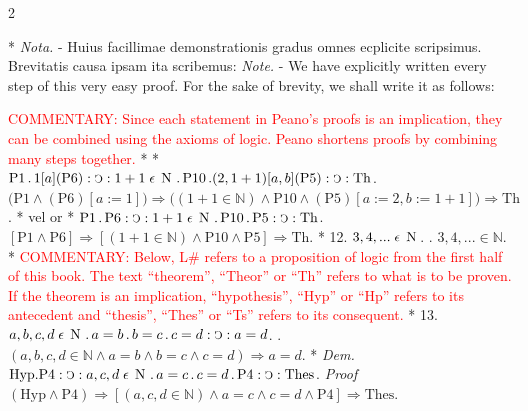 \documentclass{book}
\newcommand{\C}{\mathop{\sbox0{$\displaystyle$$\reflectbox{C}$} %
\raisebox{-\height+\ht0-0.05cm}[\ht0][\dp0]{\scalebox{0.8}[0.8]{\copy0}}}\displaylimits} %
\newcommand{\p}{\mathop{\sbox0{$\displaystyle$$.$}
\raisebox{-\height+\ht0}[\ht0][\dp0]{\scalebox{1}[1]{\copy0}}}\displaylimits} %
\newcommand{\smallIn}{\ensuremath{\mathrel{\epsilon}}}
\newcommand{\N}{\mathop{\thinspace \text{N} \thinspace}}
\renewcommand{\rightarrow}{\Rightarrow}
\newcommand\commentary[1]{\textcolor{red}{COMMENTARY: #1}}
\newenvironment{translateTwoCol}
               { %
                 \columnratio{0.5, 0.5}
                 \begin{paracol}{2}
                 \newcommand{\LAT}{\switchcolumn[0]*}
                 \newcommand{\ENG}{\switchcolumn[1]}
               }
               { %
                 \let\ENG\undefined
                 \let\LAT\undefined
                 \end{paracol}
               }
\begin{document}
\begin{translateTwoCol}
\vspace{1em}
\ENG
\vspace{1em}
\LAT
\emph{Nota.} - Huius facillimae demonstrationis gradus omnes ecplicite scripsimus. Brevitatis causa ipsam ita scribemus:
\ENG
\emph{Note.} - We have explicitly written every step of this very easy proof. For the sake of brevity, we shall write it as follows:

\commentary{Since each statement in Peano's proofs is an implication, they can be combined using the axioms of logic.  Peano shortens proofs by combining many steps together.}
\LAT
\vspace{1em}
\ENG
\vspace{1em}
\LAT
\hspace{1.4cm} $\text{P1} \p 1 [a] (\text{P6}) : \C : 1 +1 \smallIn \N \p \text{P10} \p (2, 1+1) [a, b] (\text{P5}) : \C : \text{Th}$.
\ENG
\hspace{1.4cm} $\Big( \text{P1} \wedge (\text{P6})[a:=1] \Big) \rightarrow \Big( (1 + 1 \in \mathbb{N}) \wedge \text{P10} \wedge (\text{P5})[a:=2,b:=1+1] \Big) \rightarrow \text{Th}$.
\LAT
vel
\ENG
or
\LAT
\hspace{1.4cm} $\text{P1} \p \text{P6} : \C : 1 + 1 \smallIn \N \p \text{P10} \p \text{P5} : \C : \text{Th}$.
\ENG
\hspace{1.4cm} $[\text{P1} \wedge \text{P6}] \rightarrow [(1 + 1 \in \mathbb{N}) \wedge \text{P10} \wedge \text{P5}] \rightarrow \text{Th}$.
\LAT
12. \hspace{0.67cm} $3, 4,... \smallIn \N$.
\ENG
12. \hspace{0.67cm} $3, 4, ... \in \mathbb{N}$.
\LAT
\ENG
\commentary{Below, L\# refers to a proposition of logic from the first half of this book.  The text ``theorem'', ``Theor'' or ``Th'' refers to what is to be proven.  If the theorem is an implication, ``hypothesis'', ``Hyp'' or ``Hp'' refers to its antecedent and ``thesis'', ``Thes'' or ``Ts'' refers to its consequent.}
\LAT
13. \hspace{0.67cm} $a,b,c,d \smallIn \N \p a = b \p b = c \p c = d : \C : a = d$.
\ENG
13. \hspace{0.67cm} $(a,b,c,d \in \mathbb{N} \wedge a = b \wedge b = c \wedge c = d ) \rightarrow a = d$.
\LAT
\emph{Dem.} \hspace{0.27cm} $\text{Hyp} . \text{P4} : \C : a,c,d \smallIn \N \p a = c \p c = d \p \text{P4} : \C : \text{Thes}$.
\ENG
\emph{Proof} \hspace{0.27cm} $(\text{Hyp} \wedge \text{P4}) \rightarrow [(a,c,d \in \mathbb{N}) \wedge a = c \wedge c = d \wedge \text{P4} ] \rightarrow \text{Thes}$.

\end{translateTwoCol}
\end{document}
